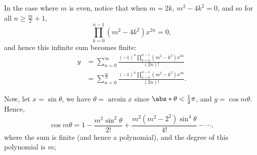 In the case where \(m\) is even, notice that when \(m = 2k\), \(m^2 - 4k^2 = 0\), and so for all \(n \geq \frac{m}{2} + 1\),
\[
    \prod_{k = 0}^{n - 1} (m^2 - 4k^2) x^{2n} = 0,
\]
and hence this infinite sum becomes finite:
\begin{align*}
    y & = \sum_{n = 0}^{\infty} \frac{(-1)^n \prod_{k = 0}^{n - 1} (m^2 - k^2) x^{2n}}{(2n)!}       \\
      & = \sum_{n = 0}^{\frac{m}{2}} \frac{(-1)^n \prod_{k = 0}^{n - 1} (m^2 - k^2) x^{2n}}{(2n)!}.
\end{align*}

Now, let \(x = \sin \theta\), we have \(\theta = \arcsin x\) since \(\abs*{\theta} < \frac{1}{2}\pi\), and \(y = \cos m\theta\). Hence,
\[
    \cos m\theta = 1 - \frac{m^2 \sin^2\theta}{2!} + \frac{m^2 (m^2 - 2^2) \sin^4\theta}{4!} - \cdots,
\]
where the sum is finite (and hence a polynomial), and the degree of this polynomial is \(m\);